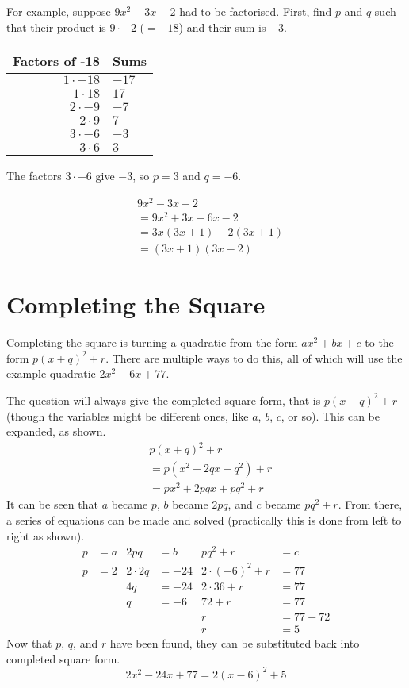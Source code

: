 For example, suppose $9x^2-3x-2$ had to be factorised. First, find $p$ and $q$ such that their product is $9 \cdot -2$ ($=-18$) and their sum is $-3$.

\medskip

\begin{tabular}{r | l}
	Factors of -18 & Sums\\
	\hline
	$1 \cdot -18$ & $-17$\\
	$-1 \cdot 18$ & $17$\\
	$2 \cdot -9$ & $-7$\\
	$-2 \cdot 9$ & $7$\\
	$3 \cdot -6$ & $-3$\\
	$-3 \cdot 6$ & $3$\\
\end{tabular}

The factors $3 \cdot -6$ give $-3$, so $p=3$ and $q=-6$.

\begin{align*}
	&9x^2-3x-2\\
	&=9x^2+3x-6x-2\\
	&=3x(3x+1)-2(3x+1)\\
	&=(3x+1)(3x-2)
\end{align*}


\section{Completing the Square}
Completing the square is turning a quadratic from the form $ax^2 + bx + c$ to the form $p(x + q)^2+r$. There are multiple ways to do this, all of which will use the example quadratic $2x^2-6x+77$.

The question will always give the completed square form, that is $p(x - q)^2+r$ (though the variables might be different ones, like $a$, $b$, $c$, or so). This can be expanded, as shown.
\begin{align*}
	&p(x+q)^2+r\\
	&=p(x^2+2qx+q^2)+r\\
	&=px^2+2pqx+pq^2+r
\end{align*}
It can be seen that $a$ became $p$, $b$ became $2pq$, and $c$ became $pq^2+r$. From there, a series of equations can be made and solved (practically this is done from left to right as shown).
\begin{align*}
	p &= a & 2pq &= b         & pq^2+r &= c\\
	p &= 2 & 2 \cdot 2q &=-24 & 2 \cdot (-6)^2 + r &= 77\\
	  &    & 4q &= -24        & 2 \cdot 36 + r &= 77\\
	  &    & q &= -6          & 72 + r &= 77\\
	  &    & &                & r &= 77 - 72\\
	  &    & &                & r &= 5
\end{align*}
Now that $p$, $q$, and $r$ have been found, they can be substituted back into completed square form.
\begin{equation*}
	2x^2-24x+77 = 2(x-6)^2+5
\end{equation*}

